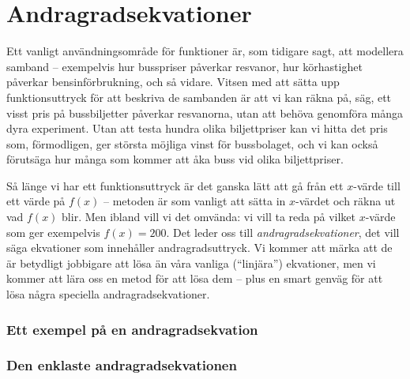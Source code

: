 \section{Andragradsekvationer}

Ett vanligt användningsområde för funktioner är, som tidigare sagt, att modellera samband -- exempelvis hur busspriser påverkar resvanor, hur körhastighet påverkar bensinförbrukning, och så vidare.
Vitsen med att sätta upp funktionsuttryck för att beskriva de sambanden är att vi kan räkna på, säg, ett visst pris på bussbiljetter påverkar resvanorna, utan att behöva genomföra många dyra experiment.
Utan att testa hundra olika biljettpriser kan vi hitta det pris som, förmodligen, ger största möjliga vinst för bussbolaget, och vi kan också förutsäga hur många som kommer att åka buss vid olika biljettpriser.

Så länge vi har ett funktionsuttryck är det ganska lätt att gå från ett $x$-värde till ett värde på $f(x)$ -- metoden är som vanligt att sätta in $x$-värdet och räkna ut vad $f(x)$ blir.
Men ibland vill vi det omvända: vi vill ta reda på vilket $x$-värde som ger exempelvis $f(x)=200$.
Det leder oss till \emph{andragradsekvationer}, det vill säga ekvationer som innehåller andragradsuttryck.
Vi kommer att märka att de är betydligt jobbigare att lösa än våra vanliga (``linjära'') ekvationer, men vi kommer att lära oss en metod för att lösa dem -- plus en smart genväg för att lösa några speciella andragradsekvationer.

\subsubsection{Ett exempel på en andragradsekvation}


\subsubsection{Den enklaste andragradsekvationen}


